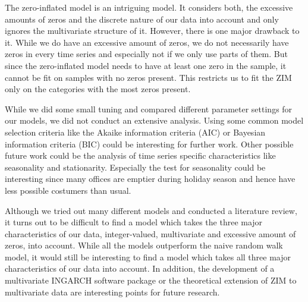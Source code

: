 The zero-inflated model is an intriguing model. It considers both, the excessive amounts of zeros and the discrete nature of our data into account and only ignores the multivariate structure of it. However, there is one major drawback to it. While we do have an excessive amount of zeros, we do not necessarily have zeros in every time series and especially not if we only use parts of them. But since the zero-inflated model needs to have at least one zero in the sample, it cannot be fit on samples with no zeros present. This restricts us to fit the ZIM only on the categories with the most zeros present. 

While we did some small tuning and compared different parameter settings for our models, we did not conduct an extensive analysis. Using some common model selection criteria like the Akaike information criteria (AIC) or Bayesian information criteria (BIC) could be interesting for further work. Other possible future work could be the analysis of time series specific characteristics like seasonality and stationarity. Especially the test for seasonality could be interesting since many offices are emptier during holiday season and hence have less possible costumers than usual. 

Although we tried out many different models and conducted a literature review, it turns out to be difficult to find a model which takes the three major characteristics of our data, integer-valued, multivariate and excessive amount of zeros, into account. While all the models outperform the naive random walk model, it would still be interesting to find a model which takes all three major characteristics of our data into account. In addition, the development of a multivariate INGARCH software package or the theoretical extension of ZIM to multivariate data are interesting points for future research. 